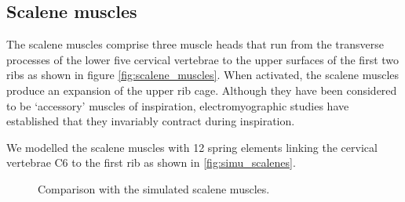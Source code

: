 \subsection{Scalene muscles}
The scalene muscles comprise three muscle heads that run from the transverse processes of the lower five cervical vertebrae to the upper surfaces of the first two ribs as shown in figure \ref{fig:scalene_muscles}. When activated, the scalene muscles produce an expansion of the upper rib cage. Although they have been considered to be `accessory' muscles of inspiration, electromyographic studies have established that they invariably contract during inspiration.

We modelled the scalene muscles with 12 spring elements linking the cervical vertebrae C6 to the first rib as shown in \ref{fig:simu_scalenes}.

\begin{figure}
\centering
{}
\caption[Comparison with the simulated scalene muscles]{\label{fig:scalenes}Comparison with the simulated scalene muscles.}
\end{figure}

